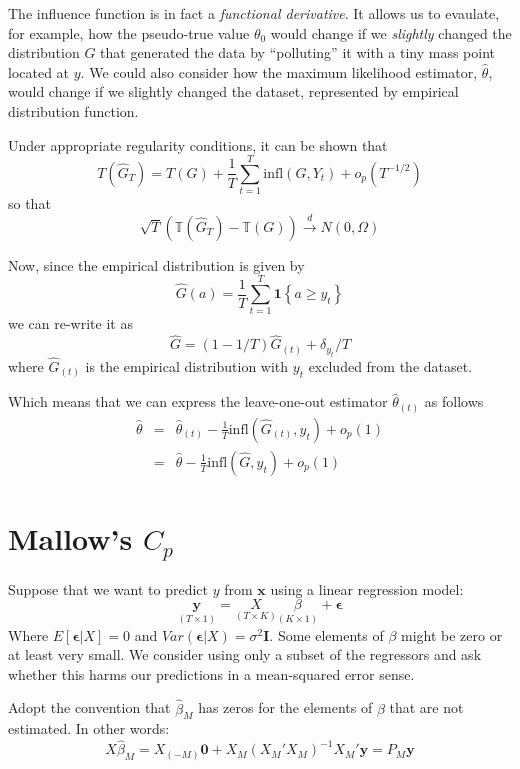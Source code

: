 \documentclass[12pt]{article}
\theoremstyle{definition}
\begin{document}
The influence function is in fact a \emph{functional derivative}. It allows us to evaulate, for example, how the pseudo-true value $\theta_0$  would change if we \emph{slightly} changed the distribution $G$ that generated the data by ``polluting'' it with a tiny mass point located at $y$. We could also consider how the maximum likelihood estimator, $\widehat{\theta}$, would change if we slightly changed the dataset, represented by empirical distribution function. 

Under appropriate regularity conditions, it can be shown that
	$$T(\widehat{G}_T) = T(G) + \frac{1}{T}\sum_{t=1}^T \mbox{infl}(G,Y_t) + o_p(T^{-1/2})$$
so that
	$$\sqrt{T}\left(\mathbb{T}(\widehat{G}_T) - \mathbb{T}(G) \right) \overset{d}{\rightarrow}N(0,\Omega)$$


Now, since the empirical distribution is given by
$$\widehat{G}(a) = \frac{1}{T}\sum_{t=1}^T \textbf{1}\left\{a \geq y_t \right\}$$
we can re-write it as 
$$\widehat{G} = (1 - 1/T) \widehat{G}_{(t)} + \delta_{y_t}/T$$
where $\widehat{G}_{(t)}$ is the empirical distribution with $y_t$ excluded from the dataset. 

Which means that we can express the leave-one-out estimator $\widehat{\theta}_{(t)}$ as follows
\begin{eqnarray*}
	\widehat{\theta} &=& \widehat{\theta}_{(t)} - \frac{1}{T} \mbox{infl}\left(\widehat{G}_{(t)}, y_t\right) + o_p(1)\\
	&=& \widehat{\theta} - \frac{1}{T} \mbox{infl}\left(\widehat{G}, y_t\right) + o_p(1)
\end{eqnarray*}





\section{Mallow's $C_p$}
Suppose that we want to predict $y$ from $\mathbf{x}$ using a linear regression model:
	$$\underset{(T\times1)}{\textbf{y}} = \underset{(T\times K)}{X} \underset{(K\times 1)}{\beta} + \boldsymbol{\epsilon}$$
Where $E[\boldsymbol{\epsilon}|X] = 0$ and $Var(\boldsymbol{\epsilon}|X) = \sigma^2 \mathbf{I}$.  Some elements of $\beta$ might be zero or at least very small. We consider using only a subset of the regressors and ask whether this harms our predictions in a mean-squared error sense.  

Adopt the convention that $\widehat{\beta}_M$ has zeros for the elements of $\beta$ that are not estimated. In other words:
	$$X\widehat{\beta}_M = X_{(-M)}\textbf{0} + X_M (X_M'X_M)^{-1} X_M'\textbf{y} = P_M \textbf{y}$$
\end{document}
